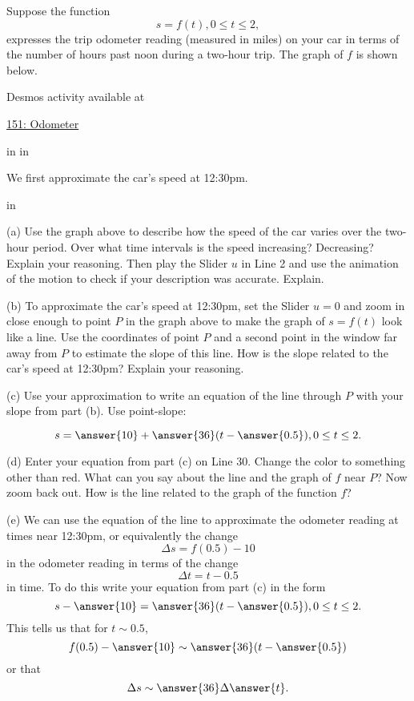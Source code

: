 \documentclass{ximera}
\newcommand{\pskip}{\vskip 0.1 in}
\begin{document}
\begin{example} \label{Ex:ldfdtgjh5}
Suppose the function
\[
    s = f(t) , 0\leq t \leq 2 ,
\]
expresses the trip odometer reading (measured in miles) on your car in terms of the number of hours past noon during a two-hour trip. The graph of $f$  is shown below.

 
\begin{onlineOnly}
    \begin{center}
\end{center}
\end{onlineOnly}

Desmos activity available at

\href{https://www.desmos.com/calculator/tumgpu4n0w}{151: Odometer}

\pskip \pskip

We first approximate the car's speed at 12:30pm.

\pskip

(a) Use the graph above to describe how the speed of the car varies over the two-hour period. Over what time intervals is the speed increasing? Decreasing? Explain your reasoning. Then play the Slider $u$ in Line 2 and use the animation of the motion to check if your description was accurate. Explain.

(b) To approximate the car's speed at 12:30pm, set the Slider $u=0$ and zoom in close enough to point $P$ in the graph above to make the graph of $s=f(t)$ look like a line. Use the coordinates of point $P$ and a second point in the window far away from $P$ to estimate the slope of this line. How is the slope related to the car's speed at 12:30pm? Explain your reasoning.

(c) Use your approximation to write an equation of the line through $P$ with your slope from part (b). Use point-slope:
\begin{question}  \label{Q:3422d3}
\[
     s =  \answer{10} + \answer{36}(t - \answer{0.5}) , 0\leq t \leq 2 .
\]

(d) Enter your equation from part (c) on Line 30. Change the color to something other than red. What can you say about the line and the graph of $f$ near $P$? Now zoom back out. How is the line related to the graph of the function $f$?

(e) We can use the equation of the line to approximate the odometer reading at times near 12:30pm, or equivalently the change
\[
   \Delta s = f(0.5) - 10
\]
in the odometer reading in terms of the change
\[
   \Delta t = t -0.5
\]   
in time. To do this write your equation from part (c) in the form
\[
      s - \answer{10}= \answer{36}(t - \answer{0.5}) , 0\leq t \leq 2 .
\]
This tells us that for $t\sim 0.5$,
\[
       f(0.5) - \answer{10} \sim  \answer{36}(t - \answer{0.5}) 
\]
or that
\[
    \Delta s \sim  \answer{36} \Delta \answer{t} .
\]    



\end{question}
\end{example}
\end{document}
